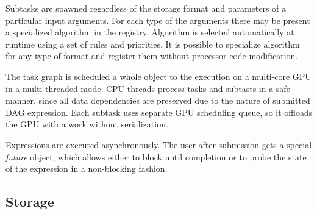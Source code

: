 Subtasks are spawned regardless of the storage format and parameters of a particular input arguments. For each type of the arguments there may be present a specialized algorithm in the registry. Algorithm is selected automatically at runtime using a set of rules and priorities. It is possible to specialize algorithm for any type of format and register them without processor code modification. 

The task graph is scheduled a whole object to the execution on a multi-core GPU in a multi-threaded mode. CPU threads process tasks and subtasts in a safe manner, since all data dependencies are preserved due to the nature of submitted DAG expression. Each subtask uses separate GPU scheduling queue, so it offloads the GPU with a work without serialization.

Expressions are executed asynchronously. The user after submission gets a special \textit{future} object, which allows either to block until completion or to probe the state of the expression in a non-blocking fashion.

\subsection{Storage}



